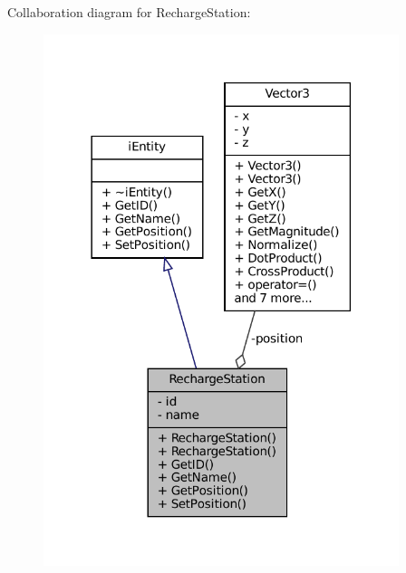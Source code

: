 Collaboration diagram for Recharge\+Station\+:\nopagebreak
\begin{figure}[H]
\begin{center}
\leavevmode
\includegraphics[width=294pt]{classRechargeStation__coll__graph}
\end{center}
\end{figure}
